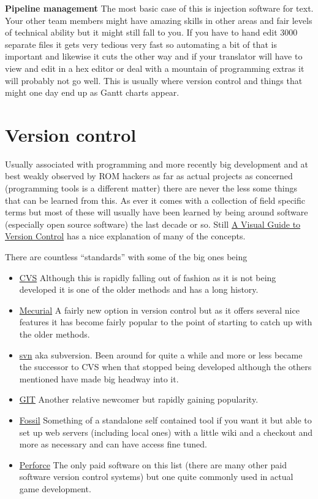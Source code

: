 \documentclass[
]{book}
\providecommand{\tightlist}{%
  \setlength{\itemsep}{0pt}\setlength{\parskip}{0pt}}
\begin{document}
\textbf{Pipeline management} The most basic case of this is injection software for text. Your other team members might have amazing skills in other areas and fair levels of technical ability but it might still fall to you. If you have to hand edit 3000 separate files it gets very tedious very fast so automating a bit of that is important and likewise it cuts the other way and if your translator will have to view and edit in a hex editor or deal with a mountain of programming extras it will probably not go well. This is usually where version control and things that might one day end up as Gantt charts appear.

\hypertarget{version-control}{%
\section{Version control}\label{version-control}}

Usually associated with programming and more recently big development and at best weakly observed by ROM hackers as far as actual projects as concerned (programming tools is a different matter) there are never the less some things that can be learned from this. As ever it comes with a collection of field specific terms but most of these will usually have been learned by being around software (especially open source software) the last decade or so. Still \href{http://betterexplained.com/articles/a-visual-guide-to-version-control/}{A Visual Guide to Version Control} has a nice explanation of many of the concepts.

There are countless ``standards'' with some of the big ones being

\begin{itemize}
\tightlist
\item
  \href{http://savannah.nongnu.org/projects/cvs}{CVS} Although this is rapidly falling out of fashion as it is not being developed it is one of the older methods and has a long history.
\item
  \href{http://mercurial.selenic.com/}{Mecurial} A fairly new option in version control but as it offers several nice features it has become fairly popular to the point of starting to catch up with the older methods.
\item
  \href{http://subversion.apache.org/}{svn} aka subversion. Been around for quite a while and more or less became the successor to CVS when that stopped being developed although the others mentioned have made big headway into it.
\item
  \href{http://git-scm.com/}{GIT} Another relative newcomer but rapidly gaining popularity.
\item
  \href{http://www.fossil-scm.org/index.html/doc/trunk/www/index.wiki}{Fossil} Something of a standalone self contained tool if you want it but able to set up web servers (including local ones) with a little wiki and a checkout and more as necessary and can have access fine tuned.
\item
  \href{http://www.perforce.com/}{Perforce} The only paid software on this list (there are many other paid software version control systems) but one quite commonly used in actual game development.
\end{itemize}
\end{document}
